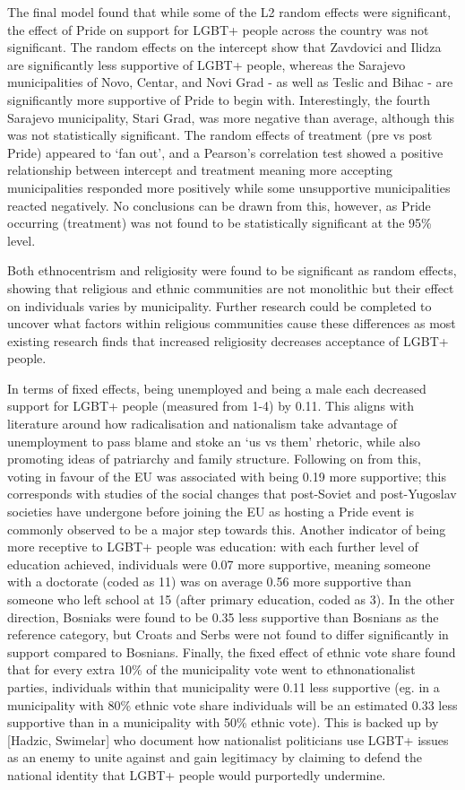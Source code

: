 \documentclass[
]{article}
\begin{document}
The final model found that while some of the L2 random effects were
significant, the effect of Pride on support for LGBT+ people across the
country was not significant. The random effects on the intercept show
that Zavdovici and Ilidza are significantly less supportive of LGBT+
people, whereas the Sarajevo municipalities of Novo, Centar, and Novi
Grad - as well as Teslic and Bihac - are significantly more supportive
of Pride to begin with. Interestingly, the fourth Sarajevo municipality,
Stari Grad, was more negative than average, although this was not
statistically significant. The random effects of treatment (pre vs post
Pride) appeared to `fan out', and a Pearson's correlation test showed a
positive relationship between intercept and treatment meaning more
accepting municipalities responded more positively while some
unsupportive municipalities reacted negatively. No conclusions can be
drawn from this, however, as Pride occurring (treatment) was not found
to be statistically significant at the 95\% level.

Both ethnocentrism and religiosity were found to be significant as
random effects, showing that religious and ethnic communities are not
monolithic but their effect on individuals varies by municipality.
Further research could be completed to uncover what factors within
religious communities cause these differences as most existing research
finds that increased religiosity decreases acceptance of LGBT+ people.

In terms of fixed effects, being unemployed and being a male each
decreased support for LGBT+ people (measured from 1-4) by 0.11. This
aligns with literature around how radicalisation and nationalism take
advantage of unemployment to pass blame and stoke an `us vs them'
rhetoric, while also promoting ideas of patriarchy and family structure.
Following on from this, voting in favour of the EU was associated with
being 0.19 more supportive; this corresponds with studies of the social
changes that post-Soviet and post-Yugoslav societies have undergone
before joining the EU as hosting a Pride event is commonly observed to
be a major step towards this. Another indicator of being more receptive
to LGBT+ people was education: with each further level of education
achieved, individuals were 0.07 more supportive, meaning someone with a
doctorate (coded as 11) was on average 0.56 more supportive than someone
who left school at 15 (after primary education, coded as 3). In the
other direction, Bosniaks were found to be 0.35 less supportive than
Bosnians as the reference category, but Croats and Serbs were not found
to differ significantly in support compared to Bosnians. Finally, the
fixed effect of ethnic vote share found that for every extra 10\% of the
municipality vote went to ethnonationalist parties, individuals within
that municipality were 0.11 less supportive (eg. in a municipality with
80\% ethnic vote share individuals will be an estimated 0.33 less
supportive than in a municipality with 50\% ethnic vote). This is backed
up by {[}Hadzic, Swimelar{]} who document how nationalist politicians
use LGBT+ issues as an enemy to unite against and gain legitimacy by
claiming to defend the national identity that LGBT+ people would
purportedly undermine.
\end{document}
